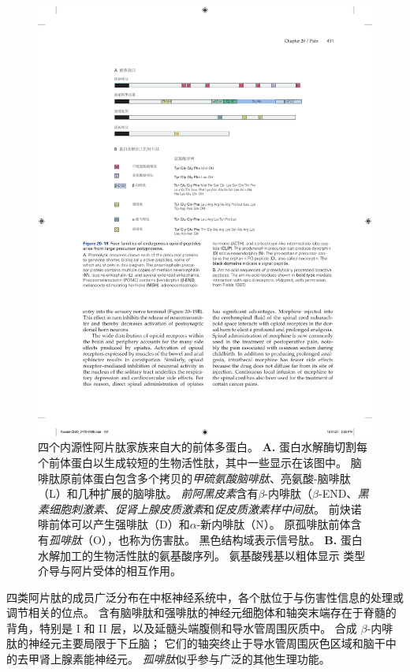 \begin{figure}[htbp]
	\centering
	\includegraphics[width=1.0\linewidth]{chap20/fig_20_18}
	\caption{四个内源性阿片肽家族来自大的前体多蛋白。
		\textbf{A.} 蛋白水解酶切割每个前体蛋白以生成较短的生物活性肽，其中一些显示在该图中。
		脑啡肽原前体蛋白包含多个拷贝的\textit{甲硫氨酸脑啡肽}、亮氨酸-脑啡肽（L）和几种扩展的脑啡肽。
		\textit{前阿黑皮素}含有$\beta$-内啡肽（$\beta$-END、\textit{黑素细胞刺激素}、\textit{促肾上腺皮质激素}和\textit{促皮质激素样中间肽}。
		前炔诺啡前体可以产生强啡肽（D）和$\alpha$-新内啡肽（N）。
		原孤啡肽前体含有\textit{孤啡肽}（O），也称为伤害肽。
		黑色结构域表示信号肽。
		\textbf{B.} 蛋白水解加工的生物活性肽的氨基酸序列。
		氨基酸残基以粗体显示 类型介导与阿片受体的相互作用\cite{fields1987painful}。}
	\label{fig:20_18}
\end{figure}


四类阿片肽的成员广泛分布在中枢神经系统中，各个肽位于与伤害性信息的处理或调节相关的位点。
含有脑啡肽和强啡肽的神经元细胞体和轴突末端存在于脊髓的背角，特别是 I 和 II 层，以及延髓头端腹侧和导水管周围灰质中。
合成 $\beta$-内啡肽的神经元主要局限于下丘脑；
它们的轴突终止于导水管周围灰色区域和脑干中的去甲肾上腺素能神经元。
\textit{孤啡肽}似乎参与广泛的其他生理功能。



